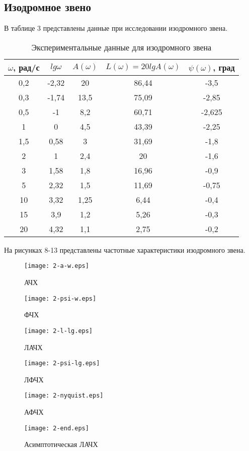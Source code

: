 \documentclass[12pt,a4paper]{article}
\begin{document}
\newpage
\begin{center}
\section{Изодромное звено}
\end{center}

В таблице 3 представлены данные при исследовании изодромного звена.
\begin{table}[h!]
	\renewcommand{\arraystretch}{1.8} %
	\centering
	\begin{threeparttable}
	\caption{Экспериментальные данные для изодромного звена}
	\begin{tabular}{|c|c|c|c|c|}
		\hline $\omega$, рад/с & $lg\omega$ & $A(\omega)$ & $L(\omega)=20lgA(\omega)$ & $\psi(\omega)$, град\\
		\hline 0,2 & -2,32 & 20 & 86,44 & -3,5\\
		\hline 0,3 & -1,74 & 13,5 & 75,09 & -2,85\\
		\hline 0,5 & -1 & 8,2 & 60,71 & -2,625\\
		\hline 1 & 0 & 4,5 & 43,39 & -2,25\\
		\hline 1,5 & 0,58 & 3 & 31,69 & -1,8\\
		\hline 2 & 1 & 2,4 & 20 & -1,6\\
		\hline 3 & 1,58 & 1,8 & 16,96 & -0,9\\
		\hline 5 & 2,32 & 1,5 & 11,69 & -0,75\\
		\hline 10 & 3,32 & 1,25 & 6,44 & -0,4\\
		\hline 15 & 3,9 & 1,2 & 5,26 & -0,3\\
		\hline 20 & 4,32 & 1,1 & 2,75 & -0,2\\
		\hline
	\end{tabular}
	\end{threeparttable}
\end{table}

На рисунках 8-13 представлены частотные характеристики изодромного звена.
\begin{figure}[H]
	\centering
	\texttt{[image: 2-a-w.eps]}
	\caption{АЧХ}
\end{figure}
\begin{figure}[H]
	\centering
	\texttt{[image: 2-psi-w.eps]}
	\caption{ФЧХ}
\end{figure}
\begin{figure}[H]
	\centering
	\texttt{[image: 2-l-lg.eps]}
	\caption{ЛАЧХ}
\end{figure}
\begin{figure}[H]
	\centering
	\texttt{[image: 2-psi-lg.eps]}
	\caption{ЛФЧХ}
\end{figure}
\begin{figure}[H]
	\centering
	\texttt{[image: 2-nyquist.eps]}
	\caption{АФЧХ}
\end{figure}
\begin{figure}[H]
	\centering
	\texttt{[image: 2-end.eps]}
	\caption{Асимптотическая ЛАЧХ}
\end{figure}
\end{document}
